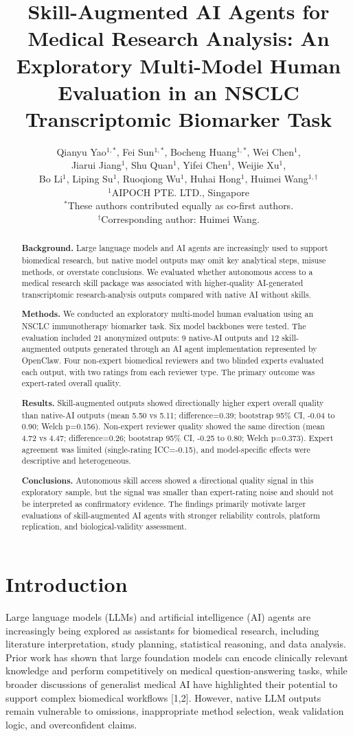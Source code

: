 \documentclass[11pt]{article}
\title{Skill-Augmented AI Agents for Medical Research Analysis: An Exploratory Multi-Model Human Evaluation in an NSCLC Transcriptomic Biomarker Task}
\author{
Qianyu Yao$^{1,*}$, Fei Sun$^{1,*}$, Bocheng Huang$^{1,*}$, Wei Chen$^{1}$,\\
Jiarui Jiang$^{1}$, Shu Quan$^{1}$, Yifei Chen$^{1}$, Weijie Xu$^{1}$,\\
Bo Li$^{1}$, Liping Su$^{1}$, Ruoqiong Wu$^{1}$, Huhai Hong$^{1}$, Huimei Wang$^{1,\dagger}$\\[0.75em]
\small $^{1}$AIPOCH PTE. LTD., Singapore\\
\small $^{*}$These authors contributed equally as co-first authors.\\
\small $^{\dagger}$Corresponding author: Huimei Wang.
}
\date{}
\begin{document}
\maketitle
\begin{abstract}
\setlength{\parindent}{0pt}
\noindent\textbf{Background.} Large language models and AI agents are increasingly used to support biomedical research, but native model outputs may omit key analytical steps, misuse methods, or overstate conclusions. We evaluated whether autonomous access to a medical research skill package was associated with higher-quality AI-generated transcriptomic research-analysis outputs compared with native AI without skills.

\noindent\textbf{Methods.} We conducted an exploratory multi-model human evaluation using an NSCLC immunotherapy biomarker task. Six model backbones were tested. The evaluation included 21 anonymized outputs: 9 native-AI outputs and 12 skill-augmented outputs generated through an AI agent implementation represented by OpenClaw. Four non-expert biomedical reviewers and two blinded experts evaluated each output, with two ratings from each reviewer type. The primary outcome was expert-rated overall quality.

\noindent\textbf{Results.} Skill-augmented outputs showed directionally higher expert overall quality than native-AI outputs (mean 5.50 vs 5.11; difference=0.39; bootstrap 95\% CI, -0.04 to 0.90; Welch p=0.156). Non-expert reviewer quality showed the same direction (mean 4.72 vs 4.47; difference=0.26; bootstrap 95\% CI, -0.25 to 0.80; Welch p=0.373). Expert agreement was limited (single-rating ICC=-0.15), and model-specific effects were descriptive and heterogeneous.

\noindent\textbf{Conclusions.} Autonomous skill access showed a directional quality signal in this exploratory sample, but the signal was smaller than expert-rating noise and should not be interpreted as confirmatory evidence. The findings primarily motivate larger evaluations of skill-augmented AI agents with stronger reliability controls, platform replication, and biological-validity assessment.
\end{abstract}

\section{Introduction}

Large language models (LLMs) and artificial intelligence (AI) agents are increasingly being explored as assistants for biomedical research, including literature interpretation, study planning, statistical reasoning, and data analysis. Prior work has shown that large foundation models can encode clinically relevant knowledge and perform competitively on medical question-answering tasks, while broader discussions of generalist medical AI have highlighted their potential to support complex biomedical workflows [1,2]. However, native LLM outputs remain vulnerable to omissions, inappropriate method selection, weak validation logic, and overconfident claims.
\end{document}
